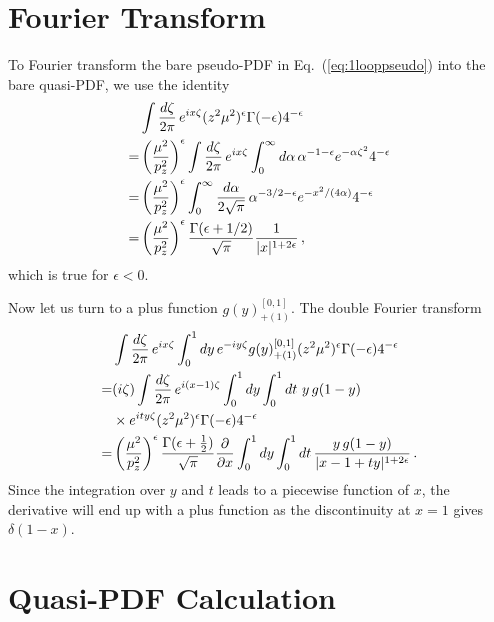 \documentclass[prd,aps,twocolumn,preprintnumbers,showpacs,nofootinbib,superscriptaddress,notitlepage]{revtex4-1}
\newcommand{\nn}{\nonumber}
\begin{document}
\appendix

\section{Fourier Transform}
\label{sec:ft}

To Fourier transform the bare pseudo-PDF in Eq.~(\ref{eq:1looppseudo}) into the bare quasi-PDF, we use the identity
\begin{align} \label{eq:ft}
&\int {d \zeta \over 2\pi}\, e^{i x \zeta} (z^2\mu^2)^{\epsilon} \Gamma(-\epsilon) 4^{-\epsilon}\nn\\
= & \left({\mu^2\over p_z^2}\right)^\epsilon \int {d \zeta \over 2\pi}\, e^{i x \zeta} \int_0^\infty d\alpha\, \alpha^{-1-\epsilon}e^{-\alpha\zeta^2}4^{-\epsilon}\nn\\
=& \left({\mu^2\over p_z^2}\right)^\epsilon \int_0^\infty {d\alpha\over 2\sqrt{\pi}}\, \alpha^{-3/2-\epsilon}e^{-x^2/(4\alpha)}4^{-\epsilon}\nn\\
=& \left({\mu^2\over p_z^2}\right)^\epsilon {\Gamma(\epsilon+1/2)\over \sqrt{\pi}} {1\over |x|^{1+2\epsilon}}\,,
\end{align}
which is true for $\epsilon<0$.

Now let us turn to a plus function $g(y)^{[0,1]}_{+(1)}$. The double Fourier transform
\begin{align}
& \int {d \zeta \over 2\pi}\, e^{i x \zeta} \int_0^1 dy\, e^{-iy\zeta} g(y)^{[0,1]}_{+(1)} (z^2\mu^2)^{\epsilon} \Gamma(-\epsilon) 4^{-\epsilon}\nn\\
= &(i\zeta)\int {d \zeta \over 2\pi}\, e^{i (x-1) \zeta} \int_0^1 dy \int_0^1 dt\ y\,g(1-y)\nn\\
&\times e^{ity\zeta} (z^2\mu^2)^{\epsilon} \Gamma(-\epsilon) 4^{-\epsilon} \nn\\
=& \left({\mu^2\over p_z^2}\right)^\epsilon {\Gamma(\epsilon+{1\over2})\over \sqrt{\pi}}{\partial\over \partial x} \int_0^1 dy \int_0^1 dt \, {y\,g(1-y) \over |x-1+ty|^{1+2\epsilon}}\,.
\end{align}
Since the integration over $y$ and $t$ leads to a piecewise function of $x$, the derivative will end up with a plus function as the discontinuity at $x=1$ gives $\delta(1-x)$.


\section{Quasi-PDF Calculation}
\label{sec:quasi}
\end{document}
